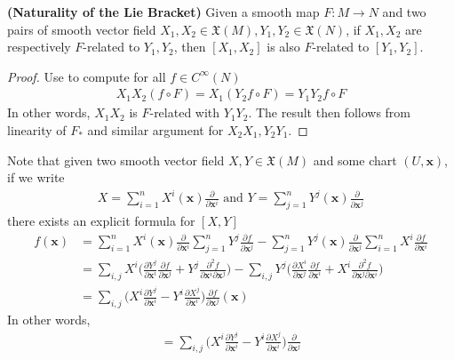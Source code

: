 \documentclass{report}
\begin{document}
\begin{theorem}
\textbf{(Naturality of the Lie Bracket)} Given a smooth map $F:M\rightarrow N$  and two pairs of smooth vector field $X_1,X_2\in \mathfrak{X}(M),Y_1,Y_2 \in \mathfrak{X}(N)$, if $X_1,X_2$ are respectively  $F$-related to  $Y_1,Y_2$, then  $[X_1,X_2]$ is also $F$-related to  $[Y_1,Y_2]$. 
\end{theorem}
\begin{proof}
Use  to compute for all $f\in C^{\infty}(N)$
\begin{align*}
  X_1X_2(f \circ F)=X_1(Y_2f \circ F)= Y_1Y_2f \circ F 
\end{align*}
In other words, $X_1X_2$ is  $F$-related with  $Y_1Y_2$. The result then follows from linearity of $F_*$ and similar argument for $X_2X_1,Y_2Y_1$.  
\end{proof}
\begin{mdframed}
Note that given two smooth vector field $X,Y \in \mathfrak{X}(M)$ and some chart $(U,\textbf{x})$, if we write 
\begin{align*}
X=\sum_{i=1}^n X^i(\textbf{x}) \frac{\partial }{\partial \textbf{x}^i} \text{ and }Y=\sum_{j=1}^n Y^j(\textbf{x}) \frac{\partial }{\partial \textbf{x}^j}
\end{align*}
there exists an explicit formula for $[X,Y]$ 
\begin{align*}
  [X,Y]f(\textbf{x})&= \sum_{i=1}^n X^i(\textbf{x}) \frac{\partial }{\partial \textbf{x}^i} \sum_{j=1}^n Y^j \frac{\partial f}{\partial \textbf{x}^j}- \sum_{j=1}^n Y^j(\textbf{x}) \frac{\partial }{\partial \textbf{x}^j}\sum_{i=1}^n X^i \frac{\partial f}{\partial \textbf{x}^i} \\
  &=\sum_{i,j}X^i \Big(\frac{\partial Y^j}{\partial \textbf{x}^i} \frac{\partial f}{\partial \textbf{x}^j}+ Y^j \frac{\partial^2 f}{\partial \textbf{x}^i \partial \textbf{x}^j} \Big)-\sum_{i,j}Y^j \Big(\frac{\partial X^i}{\partial \textbf{x}^j} \frac{\partial f}{\partial \textbf{x}^i} + X^i \frac{\partial^2 f}{\partial \textbf{x}^j\partial \textbf{x}^i} \Big) \\
  &=\sum_{i,j} \Big(X^i \frac{\partial Y^j}{\partial \textbf{x}^i}- Y^i \frac{\partial X^j}{\partial \textbf{x}^i} \Big) \frac{\partial f}{\partial \textbf{x}^j}(\textbf{x})
\end{align*}
In other words, 
\begin{align*}
[X,Y]=\sum_{i,j} \Big(X^i \frac{\partial Y^j}{\partial \textbf{x}^i}- Y^i \frac{\partial X^j}{\partial \textbf{x}^i}  \Big) \frac{\partial }{\partial \textbf{x}^j}
\end{align*}
\end{mdframed}
\end{document}
